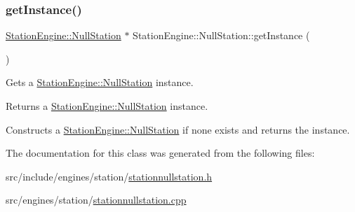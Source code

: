 \subsubsection{\texorpdfstring{getInstance()}{getInstance()}}
{\footnotesize\ttfamily \mbox{\hyperlink{classQRail_1_1StationEngine_1_1NullStation}{Station\+Engine\+::\+Null\+Station}} $\ast$ Station\+Engine\+::\+Null\+Station\+::get\+Instance (\begin{DoxyParamCaption}{ }\end{DoxyParamCaption})\hspace{0.3cm}{\ttfamily [static]}}



Gets a \mbox{\hyperlink{classQRail_1_1StationEngine_1_1NullStation}{Station\+Engine\+::\+Null\+Station}} instance. 

\begin{DoxyReturn}{Returns}
a \mbox{\hyperlink{classQRail_1_1StationEngine_1_1NullStation}{Station\+Engine\+::\+Null\+Station}} instance.
\end{DoxyReturn}
Constructs a \mbox{\hyperlink{classQRail_1_1StationEngine_1_1NullStation}{Station\+Engine\+::\+Null\+Station}} if none exists and returns the instance. 

The documentation for this class was generated from the following files\+:\begin{DoxyCompactItemize}
\item 
src/include/engines/station/\mbox{\hyperlink{stationnullstation_8h}{stationnullstation.\+h}}\item 
src/engines/station/\mbox{\hyperlink{stationnullstation_8cpp}{stationnullstation.\+cpp}}\end{DoxyCompactItemize}
